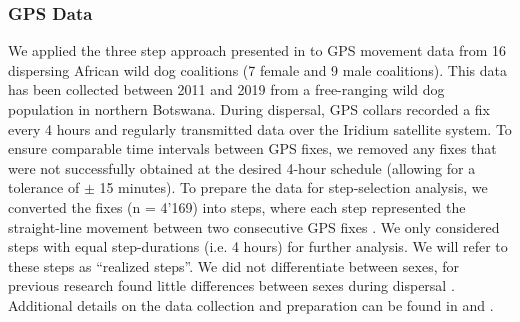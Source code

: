 \documentclass[abstract=on,10pt,a4paper,bibliography=totocnumbered]{article}
\begin{document}
\subsubsection{GPS Data}
We applied the three step approach presented in  to GPS
movement data from 16 dispersing African wild dog coalitions (7 female and 9
male coalitions). This data has been collected between 2011 and 2019 from a
free-ranging wild dog population in northern Botswana. During dispersal, GPS
collars recorded a fix every 4 hours and regularly transmitted data over the
Iridium satellite system. To ensure comparable time intervals between GPS fixes,
we removed any fixes that were not successfully obtained at the desired 4-hour
schedule (allowing for a tolerance of \( \pm \) 15 minutes). To prepare the data
for step-selection analysis, we converted the fixes (n = 4'169) into steps,
where each step represented the straight-line movement between two consecutive
GPS fixes \citep{Turchin.1998}. We only considered steps with equal
step-durations (i.e. 4 hours) for further analysis. We will refer to these steps
as ``realized steps''. We did not differentiate between sexes, for previous
research found little differences between sexes during dispersal
\citep{Woodroffe.2019, Cozzi.2020}. Additional details on the data collection
and preparation can be found in \cite{Cozzi.2020} and \cite{Hofmann.2021}.

\end{document}
